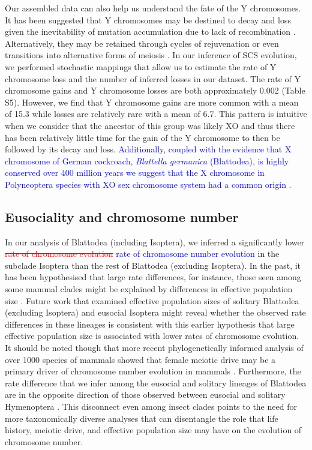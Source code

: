\documentclass[]{rsos}%
\begin{document}
Our assembled data can also help us understand the fate of the Y chromosomes. 
It has been suggested that Y chromosomes may be destined to decay and loss given the inevitability of mutation accumulation due to lack of recombination \cite{steinemann2005}.
Alternatively, they may be retained through cycles of rejuvenation or even transitions into alternative forms of meiosis \cite{blackmon2015bioessay}.
In our inference of SCS evolution, we performed stochastic mappings that allow us to estimate the rate of Y chromosome loss and the number of inferred losses in our dataset.
The rate of Y chromosome gains and Y chromosome losses are both approximately 0.002 (Table S5). 
However, we find that Y chromosome gains are more common with a mean of 15.3 while losses are relatively rare with a mean of 6.7. 
This pattern is intuitive when we consider that the ancestor of this group was likely XO and thus there has been relatively little time for the gain of the Y chromosome to then be followed by its decay and loss.
\textcolor{blue}{Additionally, coupled with the evidence that X chromosome of German cockroach, \textit{Blattella germanica} (Blattodea), is highly conserved over 400 million years we suggest that the X chromosome in Polyneoptera species with XO sex chromosome system had a common origin \cite{meisel2019x}.}

\subsection{Eusociality and chromosome number}
In our analysis of Blattodea (including Isoptera), we inferred a significantly
lower \textcolor{red}{\st{rate of chromosome evolution}} \textcolor{blue}{rate of chromosome number evolution} in the subclade Isoptera than the rest of Blattodea (excluding Isoptera).
In the past, it has been hypothesised that large rate differences, for instance, those seen among some mammal clades might be explained by differences in effective population size \cite{bush1977rapid}.
Future work that examined effective population sizes of solitary Blattodea (excluding Isoptera) and eusocial Isoptera might reveal whether the observed rate differences in these lineages is consistent with this earlier hypothesis that large effective population size is associated with lower rates of chromosome evolution.
It should be noted though that more recent phylogenetically informed analysis of over 1000 species of mammals showed that female meiotic drive may be a primary driver of chromosome number evolution in mammals \cite{blackmon2019meiotic}.
Furthermore, the rate difference that we infer among the eusocial and solitary lineages of Blattodea are in the opposite direction of those observed between eusocial and solitary Hymenoptera \cite{ross2015}.
This disconnect even among insect clades points to the need for more taxonomically diverse analyses that can disentangle the role that life history, meiotic drive, and effective population size may have on the evolution of chromosome number.
\end{document}
